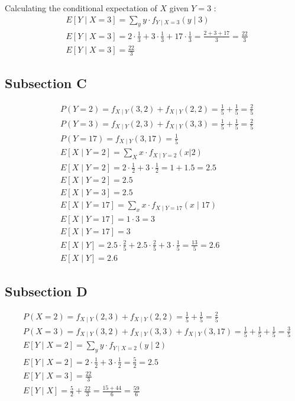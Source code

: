 \documentclass[a4paper,11pt]{article}
\theoremstyle{mytheor}
\begin{document}
Calculating the conditional expectation of $X$ given $Y=3$ :
$$
\begin{aligned}
& E[Y \mid X=3]=\sum_y y \cdot f_{Y \mid X=3}(y \mid 3) \\
& E[Y \mid X=3]=2 \cdot \frac{1}{3}+3 \cdot \frac{1}{3}+17 \cdot \frac{1}{3}=\frac{2+3+17}{3}=\frac{22}{3} \\
& E[Y \mid X=3]=\frac{22}{3}
\end{aligned}
$$


\subsection{Subsection C}
$$
\begin{aligned}
& P(Y=2)=f_{X \mid Y}(3,2)+f_{X \mid Y}(2,2)=\frac{1}{5}+\frac{1}{5}=\frac{2}{5} \\
& P(Y=3)=f_{X \mid Y}(2,3)+f_{X \mid Y}(3,3)=\frac{1}{5}+\frac{1}{5}=\frac{2}{5} \\
& P(Y=17)=f_{X \mid Y}(3,17)=\frac{1}{5}\\
& E[X \mid Y=2]=\sum_X x \cdot f_{X \mid Y=2}(x | 2) \\
& E[X \mid Y=2]=2 \cdot \frac{1}{2}+3 \cdot \frac{1}{2}=1+1.5=2.5 \\
& E[X \mid Y=2]=2.5 \\
& E[X \mid Y=3]=2.5 \\
& E[X \mid Y=17]=\sum_x x \cdot f_{X \mid Y=17}(x \mid 17) \\
& E[X \mid Y=17]=1 \cdot 3=3 \\
& E[X \mid Y=17]=3 \\
& E[X \mid Y]=2.5 \cdot \frac{2}{5}+2.5 \cdot \frac{2}{5}+3 \cdot \frac{1}{5}=\frac{13}{5}=2.6 \\
& E[X \mid Y]=2.6
\end{aligned}
$$

\subsection{Subsection D}
$$
\begin{aligned}
& P(X=2)=f_{X \mid Y}(2,3)+f_{X \mid Y}(2,2)=\frac{1}{5}+\frac{1}{5}=\frac{2}{5} \\
& P(X=3)=f_{X \mid Y}(3,2)+f_{X \mid Y}(3,3)+f_{X \mid Y}(3,17)= \frac{1}{5}+\frac{1}{5}+\frac{1}{5}=\frac{3}{5} \\
& E[Y \mid X=2]=\sum_y y \cdot f_{Y \mid X=2}(y \mid 2) \\
& E[Y \mid X=2]=2 \cdot \frac{1}{2}+3 \cdot \frac{1}{2}=\frac{5}{2}=2.5 \\
& E[Y \mid X=3]=\frac{22}{3} \\
& E[Y \mid X]=\frac{5}{2}+\frac{22}{3}=\frac{15+44}{6}=\frac{59}{6}
\end{aligned}
$$
\end{document}
